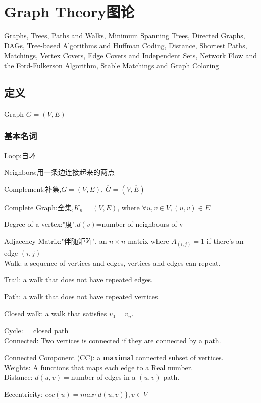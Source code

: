 \documentclass[12pt,a4paper]{ctexrep}
\begin{document}
\fi

\chapter{Graph Theory图论}
Graphs, Trees, Paths and Walks, Minimum Spanning Trees, Directed Graphs, DAGs, Tree-based Algorithms and Huffman Coding, Distance, Shortest Paths, Matchings, Vertex Covers, Edge Covers and Independent Sets, Network Flow and the Ford-Fulkerson Algorithm, Stable Matchings and Graph Coloring
\section{定义}
Graph $G = (V,E)$
\subsection{基本名词}
Loop:自环

Neighbors:用一条边连接起来的两点

Complement:补集,$G=(V,E),\,\overline{G}=(V,\overline{E})$

Complete Graph:全集,$K_{n} = (V,E)$, where $\forall u,v \in V, (u,v)\in E$

Degree of a vertex:"度",$d(v)$=number of neighbours of v

Adjacency Matrix:"伴随矩阵", an $n\times n$ matrix where $A_{(i,j)} = 1$ if there's an edge $(i,j)$\\

Walk: a sequence of vertices and edges, vertices and edges can repeat.

Trail: a walk that does not have repeated edges.

Path: a walk that does not have repeated vertices.

Closed walk: a walk that satisfies $v_{0} = v_{n}$.

Cycle: = closed path\\

Connected: Two vertices is connected if they are connected by a path.

Connected Component (CC): a \textbf{maximal} connected subset of vertices.\\

Weights: A functions that maps each edge to a Real number.\\

Distance: $d(u,v) = $number of edges in a $(u,v)$ path.

Eccentricity: $ecc(u) = max\{d(u,v)\},v \in V$
\end{document}
